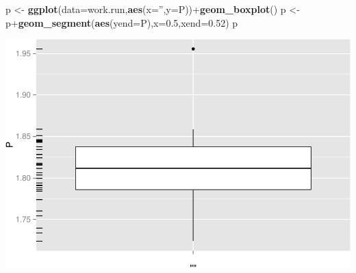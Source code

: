 \documentclass[]{article}
\newenvironment{Shaded}{\begin{snugshade}}{\end{snugshade}}
\newcommand{\KeywordTok}[1]{\textcolor[rgb]{0.13,0.29,0.53}{\textbf{{#1}}}}
\newcommand{\DataTypeTok}[1]{\textcolor[rgb]{0.13,0.29,0.53}{{#1}}}
\newcommand{\FloatTok}[1]{\textcolor[rgb]{0.00,0.00,0.81}{{#1}}}
\newcommand{\StringTok}[1]{\textcolor[rgb]{0.31,0.60,0.02}{{#1}}}
\newcommand{\NormalTok}[1]{{#1}}
\begin{document}
\begin{Shaded}
\begin{Highlighting}[]
\NormalTok{p <-}\StringTok{ }\KeywordTok{ggplot}\NormalTok{(}\DataTypeTok{data=}\NormalTok{work.run,}\KeywordTok{aes}\NormalTok{(}\DataTypeTok{x=}\StringTok{''}\NormalTok{,}\DataTypeTok{y=}\NormalTok{P))+}\KeywordTok{geom_boxplot}\NormalTok{()}
\NormalTok{p <-}\StringTok{ }\NormalTok{p+}\KeywordTok{geom_segment}\NormalTok{(}\KeywordTok{aes}\NormalTok{(}\DataTypeTok{yend=}\NormalTok{P),}\DataTypeTok{x=}\FloatTok{0.5}\NormalTok{,}\DataTypeTok{xend=}\FloatTok{0.52}\NormalTok{)}
\NormalTok{p}
\end{Highlighting}
\end{Shaded}

\includegraphics{AnalysisProcedure_files/figure-latex/work_mean_power-1.pdf}
\end{document}
